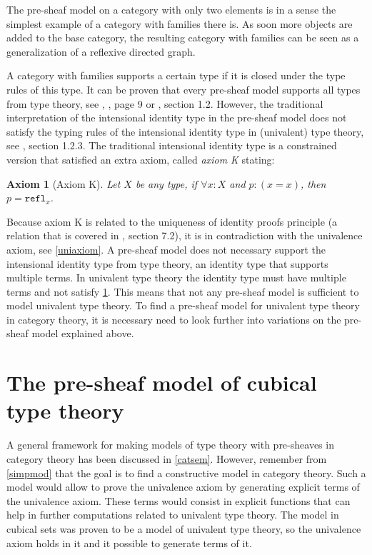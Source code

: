 \documentclass[12pt,a4paper,twoside,xetex]{book} %
\newcommand{\keyword}[1]{\emph{#1}\index{#1}}
\newtheorem{axiom}[theorem]{Axiom}
\newcommand{\op}[1]{\mathtt{#1}}
\begin{document}
The pre-sheaf model on a category with only two elements is in a sense the 
simplest example of a category with families there is. As soon more objects are 
added to the base category, the resulting category with families can be seen as 
a generalization of a reflexive directed graph. 

A category with families supports a certain type if it is closed under the type 
rules of this type.  It can be proven that every pre-sheaf model supports all 
types from type theory, see \cite{Hofmann1997}, \cite{Nuyts2018}, page 9 or 
\cite{Huber2016}, section 1.2. However, the traditional interpretation of the 
intensional identity type in the pre-sheaf model does not satisfy the typing 
rules of the intensional identity type in (univalent) type theory, see 
\cite{Huber2016}, section 1.2.3. The traditional intensional identity type is a 
constrained version that satisfied an extra axiom, called \keyword{axiom K} 
stating: 

\begin{axiom}[Axiom K]\label{axiomk}
Let $X$ be any type, if $\forall x : X$ and $p : (x = x)$, then $p = 
\op{refl}_x$.  
\end{axiom}

Because axiom K is related to the uniqueness of identity proofs principle (a 
relation that is covered in \cite{Voevodsky2013}, section 7.2), it is in 
contradiction with the univalence axiom, see \cref{uniaxiom}. A pre-sheaf model 
does not necessary support the intensional identity type from type theory, an 
identity type that supports multiple terms. In univalent type theory the 
identity type must have multiple terms and not satisfy \cref{axiomk}. This 
means that not any pre-sheaf model is sufficient to model univalent type theory. 
To find a pre-sheaf model for univalent type theory in category theory, it is 
necessary need to look further into variations on the pre-sheaf model explained 
above.  

\chapter{The pre-sheaf model of cubical type theory}\label{cubical}

A general framework for making models of type 
theory with pre-sheaves in category theory has been discussed in \cref{catsem}. However, remember from \cref{simpmod} that the goal is to find a constructive model in category theory. Such a model would allow to prove the univalence axiom by generating explicit terms of the univalence axiom. These terms would consist in explicit functions that can help in further computations related to univalent type theory. The model in cubical sets was proven to be a model of univalent type theory, so the univalence axiom holds in it and it possible 
to generate terms of it.  
\end{document}

